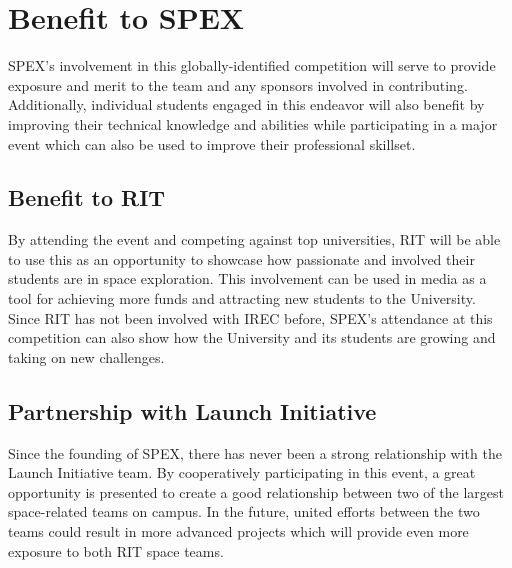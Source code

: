 \documentclass[conference]{IEEEtran} %
\begin{document}
\section{Benefit to SPEX}
\label{sec:Benefit to SPEX}

SPEX's involvement in this globally-identified competition will serve to provide exposure and merit to the team and any sponsors involved in contributing.
Additionally, individual students engaged in this endeavor will also benefit by improving their technical knowledge and abilities while
participating in a major event which can also be used to improve their professional skillset.


\subsection{Benefit to RIT}
\label{subsec:Benefit to RIT}
By attending the event and competing against top universities, RIT will be able to use this as an opportunity to showcase
how passionate and involved their students are in space exploration. This involvement can be used in media as a tool for
achieving more funds and attracting new students to the University. Since RIT has not been involved with IREC before, SPEX's attendance at
this competition can also show how the University and its students are growing and taking on new challenges.

\subsection{Partnership with Launch Initiative}
\label{subsec:Partnership with Launch Initiative}
Since the founding of SPEX, there has never been a strong relationship with the Launch Initiative team. By cooperatively participating
in this event, a great opportunity is presented to create a good relationship between two of the largest space-related teams on
campus. In the future, united efforts between the two teams could result in more advanced projects which will provide
even more exposure to both RIT space teams.
\end{document}

